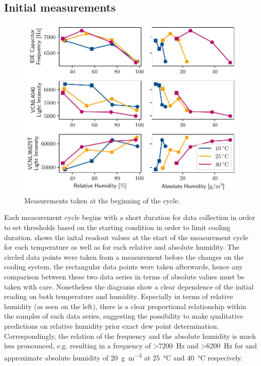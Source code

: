 \subsection{Initial measurements}

\begin{figure}[h]
    \centering
    \includegraphics[width=1\textwidth]{graphs/start_range_cap_light.pdf}
    \caption{Measurements taken at the beginning of the cycle.}
    \label{g:initial_measurements}
\end{figure}

Each measurement cycle begins with a short duration for data collection in order to set thresholds based on the starting condition in order to limit cooling duration.  shows the inital readout values at the start of the measurement cycle for each temperature as well as for each relative and absolute humidity. The circled data points were taken from a measurement before the changes on the cooling system, the rectangular data points were taken afterwards, hence any comparison between these two data series in terms of absolute values must be taken with care. Nonetheless the diagrams show a clear dependence of the initial reading on both temperature and humidity. Especially in terms of relative humidity (as seen on the left), there is a clear proportional relationship within the samples of each data series, suggesting the possibility to make qualitative predictions on relative humidity prior exact dew point determination. Correspondingly, the relation of the frequency and the absolute humidity is much less pronounced, e.g. resulting in a frequency of \textgreater\qty{7200}{\Hz} and \textgreater\qty{6200}{\Hz} for and approximate absolute humidity of \qty{20}{\g\per\m^3} at \qty{25}{\celsius} and \qty{40}{\celsius} respecively. 

